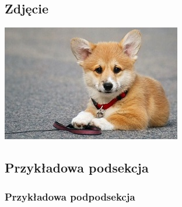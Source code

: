 \documentclass{report}
\begin{document}
        \subsection{Zdjęcie}
            \includegraphics{../corgi.jpg}

        \subsection{Przykładowa podsekcja}
            \subsubsection{Przykładowa podpodsekcja}
\end{document}
